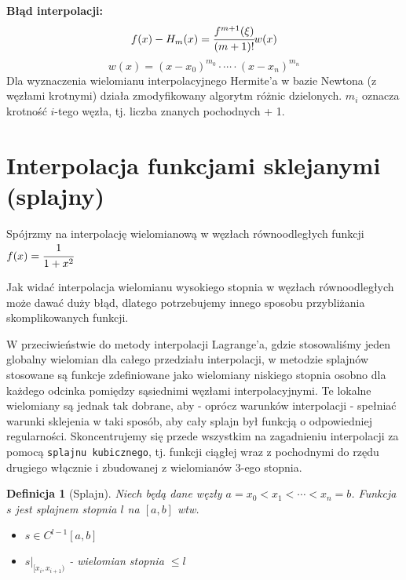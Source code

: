 \documentclass[hidelinks,a4paper,fleqn,oneside]{book}
\newtheorem{defi}{Definicja}
\begin{document}
\textbf{Błąd interpolacji:}
\[
f(x) - H_m(x) = \cfrac{f^{m+1}(\xi)}{(m+1)!}w(x)
\]
\[
	w(x) = (x-x_0)^{m_0} \cdot \cdots \cdot (x - x_n)^{m_n}
\]
Dla wyznaczenia wielomianu interpolacyjnego Hermite'a w bazie Newtona (z węzłami krotnymi) działa zmodyfikowany algorytm różnic dzielonych. $m_i$ oznacza krotność $i$-tego węzła, tj. liczba znanych pochodnych + 1.

\section{Interpolacja funkcjami sklejanymi (splajny)}
Spójrzmy na interpolację wielomianową w węzłach równoodległych funkcji $f(x) = \cfrac{1}{1+x^2}$


Jak widać interpolacja wielomianu wysokiego stopnia w węzłach równoodległych może dawać duży błąd, dlatego potrzebujemy innego sposobu przybliżania skomplikowanych funkcji.

W przeciwieństwie do metody interpolacji Lagrange'a, gdzie stosowaliśmy jeden globalny wielomian dla całego przedziału interpolacji, w metodzie splajnów stosowane są funkcje zdefiniowane jako wielomiany niskiego stopnia osobno dla każdego odcinka pomiędzy sąsiednimi węzłami interpolacyjnymi. Te lokalne wielomiany są jednak tak dobrane, aby - oprócz warunków interpolacji - spełniać warunki sklejenia w taki sposób, aby cały splajn był funkcją o odpowiedniej regularności. Skoncentrujemy się przede wszystkim na zagadnieniu interpolacji za pomocą \texttt{splajnu kubicznego}, tj. funkcji ciągłej wraz z pochodnymi do rzędu drugiego włącznie i zbudowanej z wielomianów 3-ego stopnia. 

\begin{defi}[Splajn] Niech będą dane węzły $a = x_0 < x_1 < \cdots < x_n = b$. Funkcja $s$ jest splajnem stopnia $l$ na $[a, b]$ wtw. \begin{itemize}
\item $s \in C^{l-1}[a, b]$
\item $s|_{[x_i, x_{i+1})}$ - wielomian stopnia $\leq l$
\end{itemize}
\end{defi}
\end{document}
